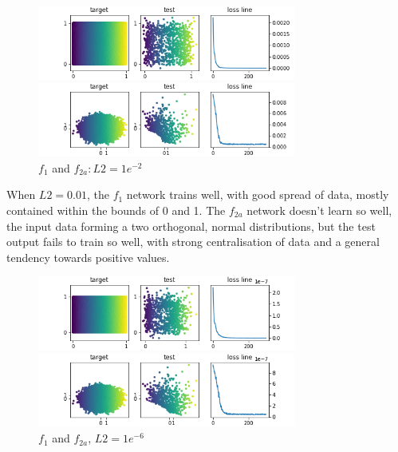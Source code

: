 \documentclass{article}
\begin{document}
\begin{figure}[htb]

\begin{minipage}[b]{1\linewidth}
  \centering
  \centerline{\includegraphics[width=8.5cm]{f1_0.01_300_1000}}
\end{minipage}
\begin{minipage}[b]{1\linewidth}
  \centering
  \centerline{\includegraphics[width=8.5cm]{f2a_0.01_300_1000}}
\end{minipage}
%
\caption{$f_1$ and $f_{2a}: L2 = 1e^{-2}$}
\label{fig:res}
%
\end{figure}

When $L2 = 0.01$, the $f_1$ network trains well, with good spread of data, mostly contained within the bounds of 0 and 1.  The $f_{2a}$ network doesn't learn so well, the input data forming a two orthogonal, normal distributions, but the test output fails to train so well, with strong centralisation of data and a general tendency towards positive values.

\begin{figure}[htb]
\begin{minipage}[b]{1\linewidth}
  \centering
  \centerline{\includegraphics[width=8.5cm]{f1_1e-06_300_1000}}
\end{minipage}
%
\begin{minipage}[b]{1\linewidth}
  \centering
  \centerline{\includegraphics[width=8.5cm]{f2a_1e-06_300_1000}}
\end{minipage}
%
\caption{$f_1$ and $f_{2a}$, $L2 = 1e^{-6}$}
\label{fig:res}
%
\end{figure}
\end{document}
